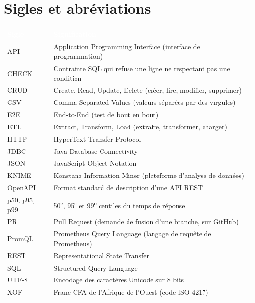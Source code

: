 \chapter*{Sigles et abréviations}

\begin{longtable}{|p{2.6cm}|p{12.5cm}|}
\hline
\rowcolor{bluedark}\textcolor{white}{\textbf{Sigle}} & \textcolor{white}{\textbf{Signification}} \\
\hline
\endhead
API & Application Programming Interface (interface de programmation) \\
\hline
CHECK & Contrainte SQL qui refuse une ligne ne respectant pas une condition \\
\hline
CRUD & Create, Read, Update, Delete (créer, lire, modifier, supprimer) \\
\hline
CSV & Comma-Separated Values (valeurs séparées par des virgules) \\
\hline
E2E & End-to-End (test de bout en bout) \\
\hline
ETL & Extract, Transform, Load (extraire, transformer, charger) \\
\hline
HTTP & HyperText Transfer Protocol \\
\hline
JDBC & Java Database Connectivity \\
\hline
JSON & JavaScript Object Notation \\
\hline
KNIME & Konstanz Information Miner (plateforme d'analyse de données) \\
\hline
OpenAPI & Format standard de description d'une API REST \\
\hline
p50, p95, p99 & 50\textsuperscript{e}, 95\textsuperscript{e} et 99\textsuperscript{e} centiles du temps de réponse \\
\hline
PR & Pull Request (demande de fusion d'une branche, sur GitHub) \\
\hline
PromQL & Prometheus Query Language (langage de requête de Prometheus) \\
\hline
REST & Representational State Transfer \\
\hline
SQL & Structured Query Language \\
\hline
UTF-8 & Encodage des caractères Unicode sur 8 bits \\
\hline
XOF & Franc CFA de l'Afrique de l'Ouest (code ISO 4217) \\
\hline
\end{longtable}
